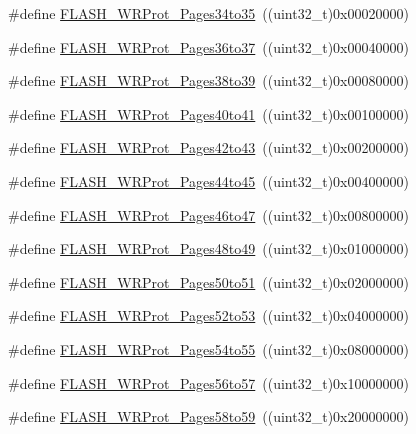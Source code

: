 \begin{DoxyCompactItemize}
\item 
\#define \hyperlink{group__Option__Bytes__Write__Protection_gaa5fee32ae0631b81413414f8e716868b}{FLASH\_\-WRProt\_\-Pages34to35}~((uint32\_\-t)0x00020000)
\item 
\#define \hyperlink{group__Option__Bytes__Write__Protection_gab00dc29c0f12afd25cdb21b6d187ccc9}{FLASH\_\-WRProt\_\-Pages36to37}~((uint32\_\-t)0x00040000)
\item 
\#define \hyperlink{group__Option__Bytes__Write__Protection_gacd33bf5c4a305a271da6035ed19cefc2}{FLASH\_\-WRProt\_\-Pages38to39}~((uint32\_\-t)0x00080000)
\item 
\#define \hyperlink{group__Option__Bytes__Write__Protection_gaaf0c1391987f76b381d26ff4b5142268}{FLASH\_\-WRProt\_\-Pages40to41}~((uint32\_\-t)0x00100000)
\item 
\#define \hyperlink{group__Option__Bytes__Write__Protection_gab9583317ad7ec30119cdd97e17e74121}{FLASH\_\-WRProt\_\-Pages42to43}~((uint32\_\-t)0x00200000)
\item 
\#define \hyperlink{group__Option__Bytes__Write__Protection_ga934a862a6a5cd350f00f5ded27e4bbd4}{FLASH\_\-WRProt\_\-Pages44to45}~((uint32\_\-t)0x00400000)
\item 
\#define \hyperlink{group__Option__Bytes__Write__Protection_ga8c9bd2510c0af75911a6b24271a33c95}{FLASH\_\-WRProt\_\-Pages46to47}~((uint32\_\-t)0x00800000)
\item 
\#define \hyperlink{group__Option__Bytes__Write__Protection_ga12744383aa65b2eb38e37d41a12bb6fe}{FLASH\_\-WRProt\_\-Pages48to49}~((uint32\_\-t)0x01000000)
\item 
\#define \hyperlink{group__Option__Bytes__Write__Protection_ga053321e47944270a5fdcf0d58e16ec13}{FLASH\_\-WRProt\_\-Pages50to51}~((uint32\_\-t)0x02000000)
\item 
\#define \hyperlink{group__Option__Bytes__Write__Protection_gae4eefefb23e8913e4aa558a6a2599fa5}{FLASH\_\-WRProt\_\-Pages52to53}~((uint32\_\-t)0x04000000)
\item 
\#define \hyperlink{group__Option__Bytes__Write__Protection_gacd4ea5e6cc3819f40a55a61f3075b626}{FLASH\_\-WRProt\_\-Pages54to55}~((uint32\_\-t)0x08000000)
\item 
\#define \hyperlink{group__Option__Bytes__Write__Protection_ga1779d1131ad245861c61dbf43a2d2d3d}{FLASH\_\-WRProt\_\-Pages56to57}~((uint32\_\-t)0x10000000)
\item 
\#define \hyperlink{group__Option__Bytes__Write__Protection_ga4a05bf4eec7521ae90ff662db2a9f4f5}{FLASH\_\-WRProt\_\-Pages58to59}~((uint32\_\-t)0x20000000)

\end{DoxyCompactItemize}
